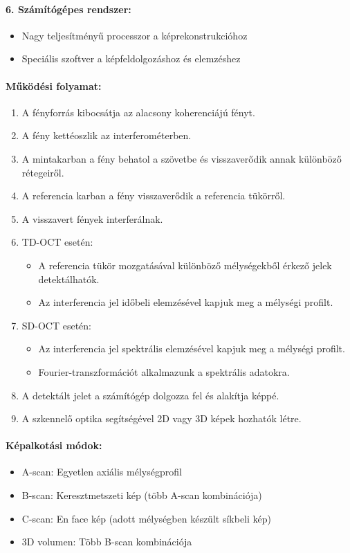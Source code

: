 \documentclass[a4paper,12pt]{article}
\begin{document}
\paragraph{6. Számítógépes rendszer:} \begin{itemize} \item Nagy teljesítményű processzor a képrekonstrukcióhoz \item Speciális szoftver a képfeldolgozáshoz és elemzéshez \end{itemize}

\paragraph{Működési folyamat:} \begin{enumerate} \item A fényforrás kibocsátja az alacsony koherenciájú fényt. \item A fény kettéoszlik az interferométerben. \item A mintakarban a fény behatol a szövetbe és visszaverődik annak különböző rétegeiről. \item A referencia karban a fény visszaverődik a referencia tükörről. \item A visszavert fények interferálnak. \item TD-OCT esetén: \begin{itemize} \item A referencia tükör mozgatásával különböző mélységekből érkező jelek detektálhatók. \item Az interferencia jel időbeli elemzésével kapjuk meg a mélységi profilt. \end{itemize} \item SD-OCT esetén: \begin{itemize} \item Az interferencia jel spektrális elemzésével kapjuk meg a mélységi profilt. \item Fourier-transzformációt alkalmazunk a spektrális adatokra. \end{itemize} \item A detektált jelet a számítógép dolgozza fel és alakítja képpé. \item A szkennelő optika segítségével 2D vagy 3D képek hozhatók létre. \end{enumerate}

\paragraph{Képalkotási módok:} \begin{itemize} \item A-scan: Egyetlen axiális mélységprofil \item B-scan: Keresztmetszeti kép (több A-scan kombinációja) \item C-scan: En face kép (adott mélységben készült síkbeli kép) \item 3D volumen: Több B-scan kombinációja \end{itemize}
\end{document}
